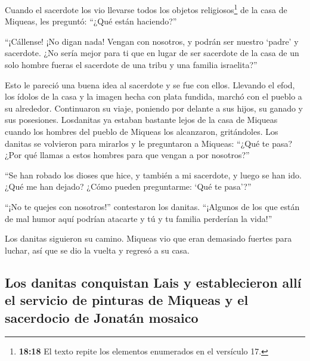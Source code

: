  Cuando el sacerdote los vio llevarse todos los objetos
religiosos\footnote{\textbf{18:18} El texto repite los elementos
  enumerados en el versículo 17.} de la casa de Miqueas, les preguntó:
``¿Qué están haciendo?''

 ``¡Cállense! ¡No digan nada! Vengan con nosotros, y
podrán ser nuestro `padre' y sacerdote. ¿No sería mejor para ti que en
lugar de ser sacerdote de la casa de un solo hombre fueras el sacerdote
de una tribu y una familia israelita?''

 Esto le pareció una buena idea al sacerdote y se fue con
ellos. Llevando el efod, los ídolos de la casa y la imagen hecha con
plata fundida, marchó con el pueblo a su alrededor. 
Continuaron su viaje, poniendo por delante a sus hijos, su ganado y sus
posesiones.  Losdanitas ya estaban bastante lejos de la
casa de Miqueas cuando los hombres del pueblo de Miqueas los alcanzaron,
 gritándoles. Los danitas se volvieron para mirarlos y le
preguntaron a Miqueas: ``¿Qué te pasa? ¿Por qué llamas a estos hombres
para que vengan a por nosotros?''

 ``Se han robado los dioses que hice, y también a mi
sacerdote, y luego se han ido. ¿Qué me han dejado? ¿Cómo pueden
preguntarme: `Qué te pasa'?''

 ``¡No te quejes con nosotros!'' contestaron los danitas.
``¡Algunos de los que están de mal humor aquí podrían atacarte y tú y tu
familia perderían la vida!''

 Los danitas siguieron su camino. Miqueas vio que eran
demasiado fuertes para luchar, así que se dio la vuelta y regresó a su
casa.

\hypertarget{los-danitas-conquistan-lais-y-establecieron-alluxed-el-servicio-de-pinturas-de-miqueas-y-el-sacerdocio-de-jonatuxe1n-mosaico}{%
\subsection{Los danitas conquistan Lais y establecieron allí el servicio
de pinturas de Miqueas y el sacerdocio de Jonatán
mosaico}\label{los-danitas-conquistan-lais-y-establecieron-alluxed-el-servicio-de-pinturas-de-miqueas-y-el-sacerdocio-de-jonatuxe1n-mosaico}}

